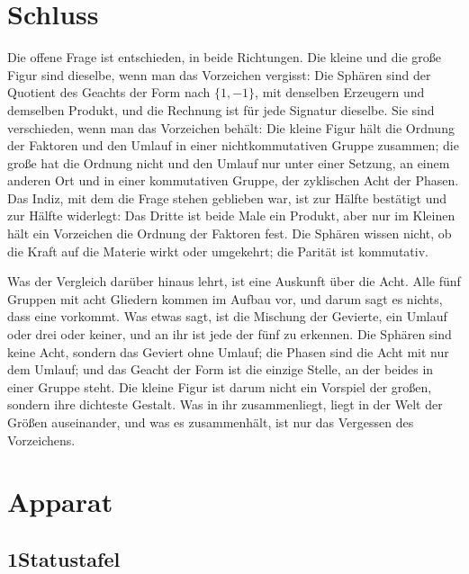 \documentclass[11pt,a4paper]{article}
\begin{document}
\section*{Schluss}

Die offene Frage ist entschieden, in beide Richtungen. Die kleine und die große Figur sind dieselbe, wenn man das Vorzeichen vergisst: Die Sphären sind der Quotient des Geachts der Form nach $\{1,-1\}$, mit denselben Erzeugern und demselben Produkt, und die Rechnung ist für jede Signatur dieselbe. Sie sind verschieden, wenn man das Vorzeichen behält: Die kleine Figur hält die Ordnung der Faktoren und den Umlauf in einer nichtkommutativen Gruppe zusammen; die große hat die Ordnung nicht und den Umlauf nur unter einer Setzung, an einem anderen Ort und in einer kommutativen Gruppe, der zyklischen Acht der Phasen. Das Indiz, mit dem die Frage stehen geblieben war, ist zur Hälfte bestätigt und zur Hälfte widerlegt: Das Dritte ist beide Male ein Produkt, aber nur im Kleinen hält ein Vorzeichen die Ordnung der Faktoren fest. Die Sphären wissen nicht, ob die Kraft auf die Materie wirkt oder umgekehrt; die Parität ist kommutativ.

Was der Vergleich darüber hinaus lehrt, ist eine Auskunft über die Acht. Alle fünf Gruppen mit acht Gliedern kommen im Aufbau vor, und darum sagt es nichts, dass eine vorkommt. Was etwas sagt, ist die Mischung der Gevierte, ein Umlauf oder drei oder keiner, und an ihr ist jede der fünf zu erkennen. Die Sphären sind keine Acht, sondern das Geviert ohne Umlauf; die Phasen sind die Acht mit nur dem Umlauf; und das Geacht der Form ist die einzige Stelle, an der beides in einer Gruppe steht. Die kleine Figur ist darum nicht ein Vorspiel der großen, sondern ihre dichteste Gestalt. Was in ihr zusammenliegt, liegt in der Welt der Größen auseinander, und was es zusammenhält, ist nur das Vergessen des Vorzeichens.

\newpage
\section*{Apparat}

\subsection*{1\quad Statustafel}
\end{document}

